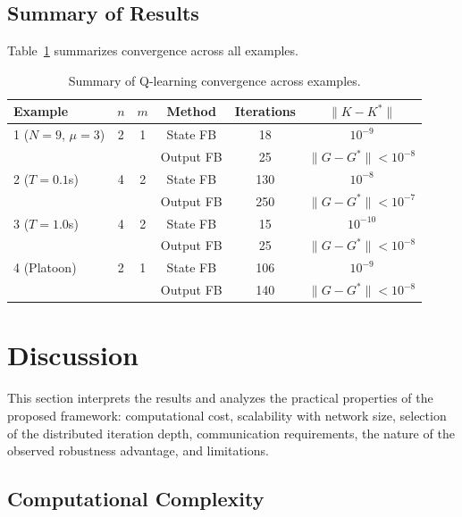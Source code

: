 \documentclass[12pt]{elsarticle}
\theoremstyle{remark}
\begin{document}
\FloatBarrier

\subsection{Summary of Results}
\label{subsec:sim_summary}

Table~\ref{tab:summary} summarizes convergence across all examples.

\begin{table}[htbp]
\centering
\caption{Summary of Q-learning convergence across examples.}
\label{tab:summary}
\small
\begin{tabular}{lccccc}
\toprule
Example & $n$ & $m$ & Method & Iterations & $\|K - K^*\|$ \\
\midrule
1 ($N{=}9$, $\mu{=}3$) & 2 & 1 & State FB & 18 & $10^{-9}$ \\
& & & Output FB & 25 & $\|G - G^*\| < 10^{-8}$ \\
\midrule
2 ($T{=}0.1$s) & 4 & 2 & State FB & 130 & $10^{-8}$ \\
& & & Output FB & 250 & $\|G - G^*\| < 10^{-7}$ \\
\midrule
3 ($T{=}1.0$s) & 4 & 2 & State FB & 15 & $10^{-10}$ \\
& & & Output FB & 25 & $\|G - G^*\| < 10^{-8}$ \\
\midrule
4 (Platoon) & 2 & 1 & State FB & 106 & $10^{-9}$ \\
& & & Output FB & 140 & $\|G - G^*\| < 10^{-8}$ \\
\bottomrule
\end{tabular}
\end{table}

\FloatBarrier

\section{Discussion}
\label{sec:discussion}

This section interprets the results and analyzes the practical properties of the proposed framework: computational cost, scalability with network size, selection of the distributed iteration depth, communication requirements, the nature of the observed robustness advantage, and limitations.

\subsection{Computational Complexity}
\label{subsec:complexity}
\end{document}
